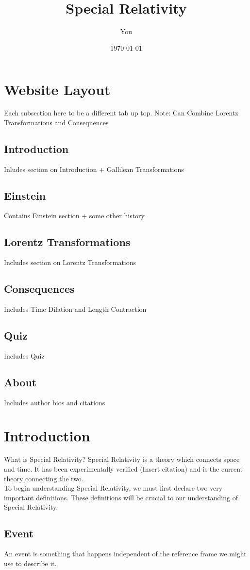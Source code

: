 \documentclass[a4paper]{article}
\title{Special Relativity}
\author{You}
\date{\today}
\begin{document}
\maketitle
\section{Website Layout}
Each subsection here to be a different tab up top. Note: Can Combine Lorentz Transformations and Consequences
\subsection{Introduction}
Inludes section on Introduction + Gallilean Transformations
\subsection{Einstein}
Contains Einstein section + some other history
\subsection{Lorentz Transformations}
Includes section on Lorentz Transformations
\subsection{Consequences}
Includes Time Dilation and Length Contraction
\subsection{Quiz}
Includes Quiz
\subsection{About}
Includes author bios and citations

\section{Introduction}
What is Special Relativity? Special Relativity is a theory which connects space and time. It has been experimentally verified (Insert citation) and is the current theory connecting the two.\\

To begin understanding Special Relativity, we must first declare two very important definitions. These definitions will be crucial to our understanding of Special Relativity.
\subsection{Event}
An event is something that happens independent of the reference frame we might use to describe it.
\end{document}
